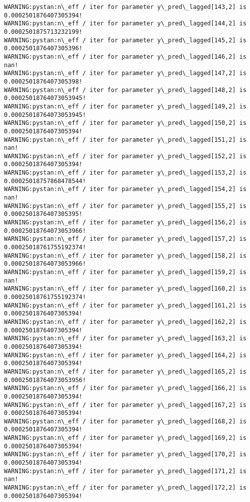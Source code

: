 \documentclass[11pt]{article}
\begin{document}
\begin{Verbatim}[commandchars=\\\{\}]
WARNING:pystan:n\_eff / iter for parameter y\_pred\_lagged[143,2] is 0.0002501876407305394!
WARNING:pystan:n\_eff / iter for parameter y\_pred\_lagged[144,2] is 0.0002501875713232199!
WARNING:pystan:n\_eff / iter for parameter y\_pred\_lagged[145,2] is 0.0002501876407305396!
WARNING:pystan:n\_eff / iter for parameter y\_pred\_lagged[146,2] is nan!
WARNING:pystan:n\_eff / iter for parameter y\_pred\_lagged[147,2] is 0.0002501876407305398!
WARNING:pystan:n\_eff / iter for parameter y\_pred\_lagged[148,2] is 0.00025018764073053945!
WARNING:pystan:n\_eff / iter for parameter y\_pred\_lagged[149,2] is 0.00025018764073053945!
WARNING:pystan:n\_eff / iter for parameter y\_pred\_lagged[150,2] is 0.0002501876407305394!
WARNING:pystan:n\_eff / iter for parameter y\_pred\_lagged[151,2] is nan!
WARNING:pystan:n\_eff / iter for parameter y\_pred\_lagged[152,2] is 0.0002501876407305394!
WARNING:pystan:n\_eff / iter for parameter y\_pred\_lagged[153,2] is 0.00025018757868478544!
WARNING:pystan:n\_eff / iter for parameter y\_pred\_lagged[154,2] is nan!
WARNING:pystan:n\_eff / iter for parameter y\_pred\_lagged[155,2] is 0.0002501876407305395!
WARNING:pystan:n\_eff / iter for parameter y\_pred\_lagged[156,2] is 0.00025018764073053966!
WARNING:pystan:n\_eff / iter for parameter y\_pred\_lagged[157,2] is 0.00025018761755192374!
WARNING:pystan:n\_eff / iter for parameter y\_pred\_lagged[158,2] is 0.00025018764073053966!
WARNING:pystan:n\_eff / iter for parameter y\_pred\_lagged[159,2] is nan!
WARNING:pystan:n\_eff / iter for parameter y\_pred\_lagged[160,2] is 0.00025018761755192374!
WARNING:pystan:n\_eff / iter for parameter y\_pred\_lagged[161,2] is 0.0002501876407305394!
WARNING:pystan:n\_eff / iter for parameter y\_pred\_lagged[162,2] is 0.0002501876407305394!
WARNING:pystan:n\_eff / iter for parameter y\_pred\_lagged[163,2] is 0.0002501876407305394!
WARNING:pystan:n\_eff / iter for parameter y\_pred\_lagged[164,2] is 0.0002501876407305394!
WARNING:pystan:n\_eff / iter for parameter y\_pred\_lagged[165,2] is 0.00025018764073053956!
WARNING:pystan:n\_eff / iter for parameter y\_pred\_lagged[166,2] is 0.0002501876407305394!
WARNING:pystan:n\_eff / iter for parameter y\_pred\_lagged[167,2] is 0.0002501876407305394!
WARNING:pystan:n\_eff / iter for parameter y\_pred\_lagged[168,2] is 0.0002501876407305394!
WARNING:pystan:n\_eff / iter for parameter y\_pred\_lagged[169,2] is 0.0002501876407305394!
WARNING:pystan:n\_eff / iter for parameter y\_pred\_lagged[170,2] is 0.0002501876407305394!
WARNING:pystan:n\_eff / iter for parameter y\_pred\_lagged[171,2] is nan!
WARNING:pystan:n\_eff / iter for parameter y\_pred\_lagged[172,2] is 0.0002501876407305394!

\end{Verbatim}
\end{document}
